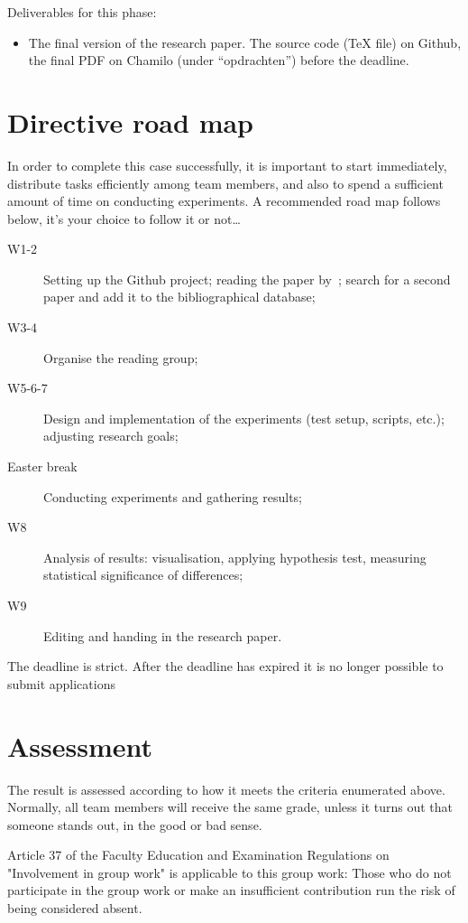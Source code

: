 \documentclass[fleqn,10pt]{artikeltin}
\begin{document}
Deliverables for this phase:

\begin{itemize}
	\item The final version of the research paper. The source code (TeX file) on Github, the final PDF on Chamilo (under ``opdrachten'') before the deadline.
\end{itemize}

\section{Directive road map}
\label{sec:roadmap}

In order to complete this case successfully, it is important to start immediately, distribute tasks efficiently among team members, and also to spend a sufficient amount of time on conducting experiments. A recommended road map follows below, it's your choice to follow it or not\ldots

\begin{description}
	\item[W1-2] Setting up the Github project; reading the paper by~\textcite{Bassil2012}; search for a second paper and add it to the bibliographical database;
	\item[W3-4] Organise the reading group;
	\item[W5-6-7] Design and implementation of the experiments (test setup, scripts, etc.); adjusting research goals;
	\item[Easter break] Conducting experiments and gathering results;
	\item[W8] Analysis of results: visualisation, applying hypothesis test, measuring statistical significance of differences;
	\item[W9] Editing and handing in the research paper.
\end{description}
The deadline is strict. After the deadline has expired
it is no longer possible to submit applications
\section{Assessment}

The result is assessed according to how it meets the criteria enumerated above. Normally, all team members will receive the same grade, unless it turns out that someone stands out, in the good or bad sense. 

Article 37 of the Faculty Education and Examination Regulations on "Involvement in group work" is applicable to this group work: Those who do not participate in the group work or make an insufficient contribution run the risk of being considered absent. 
\end{document}
